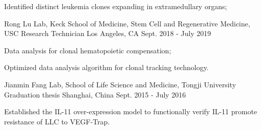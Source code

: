 \begin{cventries}
{\begin{cvitems}
                \vspace{0.5em}
                \item {Identified distinct leukemia clones expanding in extramedullary organs;}
         \end{cvitems}
        }
    \cventry
        {Rong Lu Lab, Keck School of Medicine, Stem Cell and Regenerative Medicine, USC} %
        {Research Technician} %
        {Los Angeles, CA} %
        {Sept. 2018 - July 2019} %
        {
            \begin{cvitems} %
                \vspace{0.5em}
                \item {Data analysis for clonal hematopoietic compensation;}
                \item {Optimized data analysis algorithm for clonal tracking technology.}
                \vspace{0.5em}
            \end{cvitems}
        }
    \cventry
        {Jianmin Fang Lab, School of Life Science and Medicine, Tongji University} %
        {Graduation thesis} %
        {Shanghai, China} %
        {Sept. 2015 - July 2016} %
        {
            \begin{cvitems} %
                \vspace{0.5em}
                \item[] 
                \item {Established the IL-11 over-expression model to functionally verify IL-11 promote resistance of LLC to VEGF-Trap.}
                \vspace{0.5em}
            \end{cvitems}
        }    
\end{cventries}
